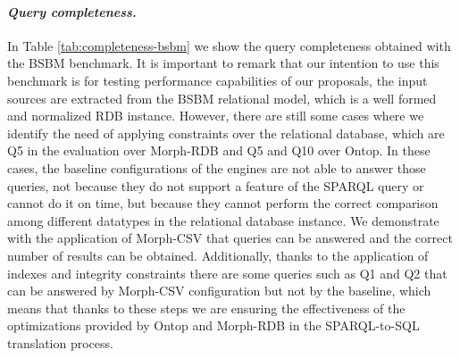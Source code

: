 \noindent\paragraph*{\textit{Query completeness.}} In Table \ref{tab:completeness-bsbm} we show the query completeness obtained with the BSBM benchmark. It is important to remark that our intention to use this benchmark is for testing performance capabilities of our proposals, the input sources are extracted from the BSBM relational model, which is a well formed and normalized RDB instance. However, there are still some cases where we identify the need of applying constraints over the relational database, which are Q5 in the evaluation over Morph-RDB and Q5 and Q10 over Ontop. In these cases, the baseline configurations of the engines are not able to answer those queries, not because they do not support a feature of the SPARQL query or  cannot do it on time, but because they cannot perform the correct comparison among different datatypes in the relational database instance. We demonstrate  with the application of Morph-CSV that queries can be answered and  the correct number of results can be obtained. Additionally, thanks to the application of indexes and integrity constraints there are some queries such as Q1 and Q2 that can be answered by Morph-CSV configuration but not by the baseline, which means that thanks to these steps we are ensuring the effectiveness of the optimizations provided by Ontop and Morph-RDB in the SPARQL-to-SQL translation process. 


